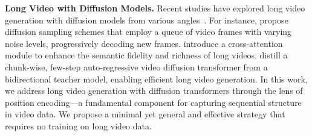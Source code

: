 \textbf{Long Video with Diffusion Models.}
Recent studies have explored long video generation with diffusion models from various angles~\cite{lu2024freelong,wang2023genlvideo,wang2024lingen,wang2024loong,lin2023videodirectorgpt,li2024arlon,qiu2023freenoise,nvidia2025cosmos}. For instance, \citet{kim2024fifodiffusion, chen2025ouroboros} propose diffusion sampling schemes that employ a queue of video frames with varying noise levels, progressively decoding new frames. \citet{yan2024long} introduce a cross-attention module to enhance the semantic fidelity and richness of long videos. \citet{yin2024slow} distill a chunk-wise, few-step auto-regressive video diffusion transformer from a bidirectional teacher model, enabling efficient long video generation.
In this work, we address long video generation with diffusion transformers through the lens of position encoding—a fundamental component for capturing sequential structure in video data. We propose a minimal yet general and effective strategy that requires no training on long video data.


